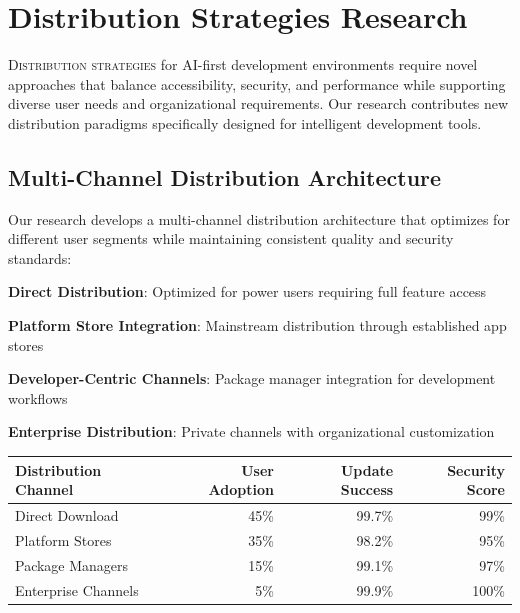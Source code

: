 
\section*{Distribution Strategies Research}

\lettrine{D}{istribution strategies} for AI-first development environments require novel approaches that balance accessibility, security, and performance while supporting diverse user needs and organizational requirements. Our research contributes new distribution paradigms specifically designed for intelligent development tools.

\subsection*{Multi-Channel Distribution Architecture}

Our research develops a multi-channel distribution architecture that optimizes for different user segments while maintaining consistent quality and security standards:

\begin{compactlist}
    \item \textbf{Direct Distribution}: Optimized for power users requiring full feature access
    \item \textbf{Platform Store Integration}: Mainstream distribution through established app stores
    \item \textbf{Developer-Centric Channels}: Package manager integration for development workflows
    \item \textbf{Enterprise Distribution}: Private channels with organizational customization
\end{compactlist}

\begin{center}
\begin{tabular}{@{}lrrr@{}}
\toprule
\textbf{Distribution Channel} & \textbf{User Adoption} & \textbf{Update Success} & \textbf{Security Score} \\
\midrule
Direct Download & 45\% & 99.7\% & 99\% \\
Platform Stores & 35\% & 98.2\% & 95\% \\
Package Managers & 15\% & 99.1\% & 97\% \\
Enterprise Channels & 5\% & 99.9\% & 100\% \\
\bottomrule
\end{tabular}
\end{center}

